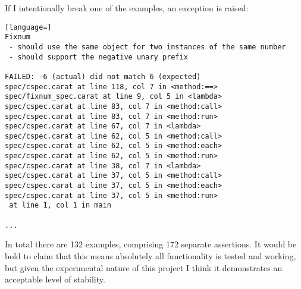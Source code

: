 If I intentionally break one of the examples, an exception is raised:

\begin{lstlisting}[language=]
Fixnum
 - should use the same object for two instances of the same number
 - should support the negative unary prefix

FAILED: -6 (actual) did not match 6 (expected)
spec/cspec.carat at line 118, col 7 in <method:==>
spec/fixnum_spec.carat at line 9, col 5 in <lambda>
spec/cspec.carat at line 83, col 7 in <method:call>
spec/cspec.carat at line 83, col 7 in <method:run>
spec/cspec.carat at line 67, col 7 in <lambda>
spec/cspec.carat at line 62, col 5 in <method:call>
spec/cspec.carat at line 62, col 5 in <method:each>
spec/cspec.carat at line 62, col 5 in <method:run>
spec/cspec.carat at line 38, col 7 in <lambda>
spec/cspec.carat at line 37, col 5 in <method:call>
spec/cspec.carat at line 37, col 5 in <method:each>
spec/cspec.carat at line 37, col 5 in <method:run>
 at line 1, col 1 in main

...
\end{lstlisting}

In total there are 132 examples, comprising 172 separate assertions. It would be bold to claim that this means absolutely all functionality is tested and working, but given the experimental nature of this project I think it demonstrates an acceptable level of stability.
